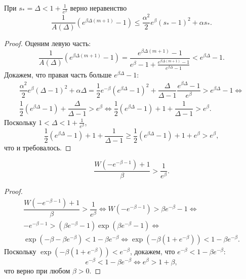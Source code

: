 \begin{proposition}
	При $s_* = \Delta < 1 + \frac{1}{e^{\beta}}$ верно неравенство
	$$
	\dfrac{1}{A(\Delta)}\left(e^{\beta\Delta(m + 1)} - 1\right) \leqslant \dfrac{\alpha^2}{2}e^{\beta}(s_* - 1)^2 + \alpha s_*.
	$$
\end{proposition}
\begin{proof}
	Оценим левую часть:
	\[
	\dfrac{1}{A(\Delta)}\left(e^{\beta\Delta(m + 1)} - 1\right) = \dfrac{e^{\beta\Delta(m + 1)} - 1}{e^{\beta} - 1 + \frac{e^{\beta\Delta(m + 1)} - 1}{e^{\beta\Delta} - 1}} < e^{\beta \Delta} - 1.
	\]
	Докажем, что правая часть больше $e^{\beta \Delta} - 1$:
	\begin{multline*}
		\dfrac{\alpha^2}{2}e^{\beta}(\Delta - 1)^2 + \alpha\Delta = \dfrac{1}{2}e^{-\beta}(e^{\beta\Delta} - 1)^2 + \dfrac{\Delta}{\Delta - 1}\dfrac{e^{\beta\Delta} - 1}{e^{\beta}} > e^{\beta \Delta} - 1 \Leftrightarrow\\
		\dfrac{1}{2}(e^{\beta\Delta} - 1) + \dfrac{\Delta}{\Delta - 1} > e^{\beta} \Leftrightarrow
		\dfrac{1}{2}(e^{\beta\Delta} - 1) + 1 + \dfrac{1}{\Delta - 1} > e^{\beta}.
	\end{multline*}
	Поскольку $1 < \Delta < 1 + \frac{1}{e^{\beta}}$,
	$$
	\dfrac{1}{2}(e^{\beta\Delta} - 1) + 1 + \dfrac{1}{\Delta - 1} \geqslant \dfrac{1}{2}(e^{\beta\Delta} - 1) + 1 + e^{\beta} > e^{\beta},
	$$
	что и требовалось.
\end{proof}

\begin{lemma}
	\label{lm:delta_min}
	$$\dfrac{W(-e^{-\beta - 1}) + 1}{\beta} > \dfrac{1}{e^{\beta}}.$$
\end{lemma}
\begin{proof}
	\begin{multline*}
		\dfrac{W(-e^{-\beta - 1}) + 1}{\beta} > \dfrac{1}{e^{\beta}} \Leftrightarrow
		W(-e^{-\beta - 1}) > \beta e^{-\beta} - 1 \Leftrightarrow \\
		-e^{-\beta - 1} > (\beta e^{-\beta} - 1)\exp(\beta e^{-\beta} - 1) \Leftrightarrow \\
		\exp(-\beta - \beta e^{-\beta}) < 
		1 - \beta e^{-\beta} \Leftrightarrow \exp(-\beta(1 + e^{-\beta})) < 1 - \beta e^{-\beta}.
	\end{multline*}
	Поскольку $\exp(-\beta(1 + e^{-\beta})) < e^{-\beta}$, докажем, что $e^{-\beta} < 1 - \beta e^{-\beta}$:
	\[
	e^{-\beta} < 1 - \beta e^{-\beta} \Leftrightarrow e^{\beta} > 1 + \beta,
	\]
	что верно при любом $\beta > 0$.
\end{proof}

